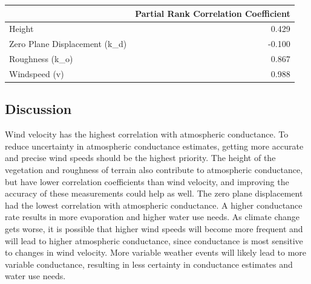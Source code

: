 \documentclass[
]{article}
\newenvironment{Shaded}{\begin{snugshade}}{\end{snugshade}}
\newcommand{\AttributeTok}[1]{\textcolor[rgb]{0.77,0.63,0.00}{#1}}
\newcommand{\CommentTok}[1]{\textcolor[rgb]{0.56,0.35,0.01}{\textit{#1}}}
\newcommand{\ConstantTok}[1]{\textcolor[rgb]{0.00,0.00,0.00}{#1}}
\newcommand{\DecValTok}[1]{\textcolor[rgb]{0.00,0.00,0.81}{#1}}
\newcommand{\FunctionTok}[1]{\textcolor[rgb]{0.00,0.00,0.00}{#1}}
\newcommand{\NormalTok}[1]{#1}
\newcommand{\OtherTok}[1]{\textcolor[rgb]{0.56,0.35,0.01}{#1}}
\newcommand{\SpecialCharTok}[1]{\textcolor[rgb]{0.00,0.00,0.00}{#1}}
\newcommand{\StringTok}[1]{\textcolor[rgb]{0.31,0.60,0.02}{#1}}
\begin{document}
\begin{Shaded}
\end{Shaded}

\begin{table}
\centering
\begin{tabular}{l|r}
\hline
  & Partial Rank Correlation Coefficient\\
\hline
Height & 0.429\\
\hline
Zero Plane Displacement (k\_d) & -0.100\\
\hline
Roughness (k\_o) & 0.867\\
\hline
Windspeed (v) & 0.988\\
\hline
\end{tabular}
\end{table}

\hypertarget{discussion}{%
\subsection{Discussion}\label{discussion}}

Wind velocity has the highest correlation with atmospheric conductance.
To reduce uncertainty in atmospheric conductance estimates, getting more
accurate and precise wind speeds should be the highest priority. The
height of the vegetation and roughness of terrain also contribute to
atmospheric conductance, but have lower correlation coefficients than
wind velocity, and improving the accuracy of these measurements could
help as well. The zero plane displacement had the lowest correlation
with atmospheric conductance. A higher conductance rate results in more
evaporation and higher water use needs. As climate change gets worse, it
is possible that higher wind speeds will become more frequent and will
lead to higher atmospheric conductance, since conductance is most
sensitive to changes in wind velocity. More variable weather events will
likely lead to more variable conductance, resulting in less certainty in
conductance estimates and water use needs.
\end{document}
